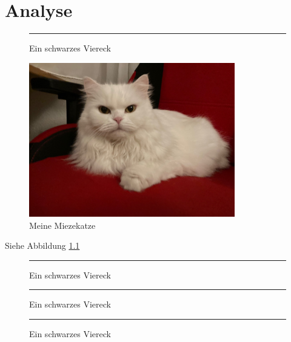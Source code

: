 \chapter{Analyse}

\begin{figure}[h]\centering
\rule{6cm}{4cm}
\caption{Ein schwarzes Viereck}
\end{figure}

\blindtext[10]

\blindtext[10]

\begin{figure}[h] \center
\includegraphics[width=0.8\textwidth]{Images/Katze}
\caption{Meine Miezekatze}\label{fig:Katze1}
\end{figure}


\blindtext[10]

\blindtext[10]

\blindtext[10]

Siehe Abbildung \ref{fig:Katze1}

\blindtext[10]


\begin{figure}[h]\centering
\rule{6cm}{4cm}
\caption{Ein schwarzes Viereck}
\end{figure}

\blindtext[10]

\blindtext[10]

\blindtext[10]

\blindtext[10]

\blindtext[10]



\blindtext[10]


\begin{figure}[h]\centering
\rule{6cm}{4cm}
\caption{Ein schwarzes Viereck}
\end{figure}

\blindtext[10]

\blindtext[10]

\blindtext[10]

\blindtext[10]

\blindtext[10]



\blindtext[10]


\begin{figure}[h]\centering
\rule{6cm}{4cm}
\caption{Ein schwarzes Viereck}
\end{figure}

\blindtext[10]

\blindtext[10]

\blindtext[10]

\blindtext[10]

\blindtext[10]



\blindtext[10]

